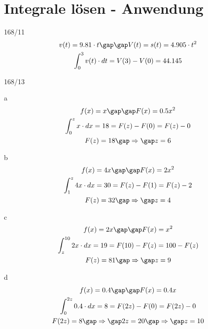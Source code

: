 \section{Integrale lösen - Anwendung}
\begin{exercise}{168/11}
  \begin{gather*}
    v(t) = 9.81 \cdot t \gap\gap V(t) = s(t) = 4.905 \cdot t^2 \\
    \int_0^3 v(t) \cdot dt = V(3) - V(0) = 44.145
  \end{gather*}
\end{exercise}
\begin{exercise}{168/13}
  \item [a]
  \begin{gather*}
    f(x) = x \gap\gap F(x) = 0.5x^2 \\
    \int_0^z x \cdot dx = 18 = F(z) - F(0) = F(z) - 0 \\
    F(z) = 18 \gap\Rightarrow\gap z = 6
  \end{gather*}
  \item [b]
  \begin{gather*}
    f(x) = 4x \gap\gap F(x) = 2x^2 \\
    \int_1^z 4x \cdot dx = 30 = F(z) - F(1) = F(z) - 2 \\
    F(z) = 32 \gap\Rightarrow\gap z = 4
  \end{gather*}
  \item [c]
  \begin{gather*}
    f(x) = 2x \gap\gap F(x) = x^2 \\
    \int_z^{10} 2x \cdot dx = 19 = F(10) - F(z) = 100 - F(z) \\
    F(z) = 81 \gap\Rightarrow\gap z = 9
  \end{gather*}
  \item [d]
  \begin{gather*}
    f(x) = 0.4 \gap\gap F(x) = 0.4x \\
    \int_0^{2z} 0.4 \cdot dx = 8 = F(2z) - F(0) = F(2z) - 0 \\
    F(2z) = 8 \gap\Rightarrow\gap 2z = 20 \gap\Rightarrow\gap z = 10
  \end{gather*}
\end{exercise}
